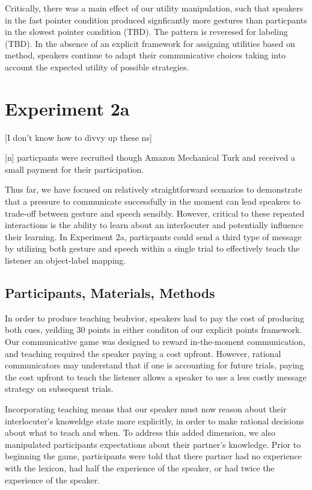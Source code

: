 \documentclass[10pt, letterpaper]{article}
\begin{document}
Critically, there was a main effect of our utility manipulation, such
that speakers in the fast pointer condition produced signficantly more
gestures than particpants in the slowest pointer condition (TBD). The
pattern is reveresed for labeling (TBD). In the absence of an explicit
framework for assigning utilities based on method, speakers continue to
adapt their communicative choices taking into account the expected
utility of possible strategies.

\section{Experiment 2a}\label{experiment-2a}

{[}I don't know how to divvy up these ns{]}

{[}n{]} particpants were recruited though Amazon Mechanical Turk and
received a small payment for their participation.

Thus far, we have focused on relatively straightforward scenarios to
demonstrate that a pressure to communicate successfully in the moment
can lead speakers to trade-off between gesture and speech sensibly.
However, critical to these repeated interactions is the ability to learn
about an interlocuter and potentially influence their learning. In
Experiment 2a, particpants could send a third type of message by
utilizing both gesture and speech within a single trial to effectively
teach the listener an object-label mapping.

\subsection{Participants, Materials,
Methods}\label{participants-materials-methods-2}

In order to produce teaching beahvior, speakers had to pay the cost of
producing both cues, yeilding 30 points in either conditon of our
explicit points framework. Our communicative game was designed to reward
in-the-moment communication, and teaching required the speaker paying a
cost upfront. However, rational communicators may understand that if one
is accounting for future trials, paying the cost upfront to teach the
listener allows a speaker to use a less costly message strategy on
subsequent trials.

Incorporating teaching means that our speaker must now reason about
their interlocuter's knoweldge state more explicitly, in order to make
rational decisions about what to teach and when. To address this added
dimension, we also manipulated participants expectations about their
partner's knowledge. Prior to beginning the game, participants were told
that there partner had no experience with the lexicon, had half the
experience of the speaker, or had twice the experience of the speaker.
\end{document}

